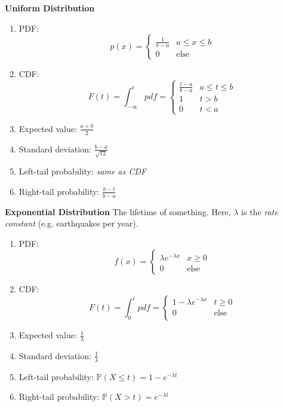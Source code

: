 \documentclass[titlepage, 12pt, leqno]{article}
\begin{document}
\begin{multicols*}{2}
\begin{enumerate}
\end{enumerate}
\textbf{Uniform Distribution}
\begin{enumerate}
    \item PDF: 
        \[
            p(x) =
            \begin{cases}
                \frac{1}{b-a} & a \le x \le b \\
                0 & \text{else}
            \end{cases}
        \]
    \item CDF:
        \[
            F(t) = \int_{-\infty}^{t}pdf =
            \begin{cases}
                \frac{t-a}{b-a} & a \le t \le b \\
                1 & t > b \\
                0 & t < a
            \end{cases}
        \]
    \item Expected value: $\frac{a+b}{2}$ 
    \item Standard deviation: $\frac{b-a}{\sqrt{12}}$
    \item Left-tail probability: \textit{same as CDF}
    \item Right-tail probability: $\frac{b-t}{b-a}$
\end{enumerate}
\textbf{Exponential Distribution}
The lifetime of something. Here, $\lambda$ is the \textit{rate constant} (e.g.
earthquakes per year).
\begin{enumerate}
    \item PDF: 
        \[
            f(x) =
            \begin{cases}
                \lambda e^{-\lambda x} & x \ge 0 \\
                0 & \text{else}
            \end{cases}
        \]
    \item CDF:
        \[
            F(t) = \int_{0}^{t}pdf =
            \begin{cases}
                1 - \lambda e^{-\lambda x} & t \ge 0 \\
                0 & \text{else} \\
            \end{cases}
        \]
    \item Expected value: $\frac{1}{\lambda}$ 
    \item Standard deviation: $\frac{1}{\lambda}$
    \item Left-tail probability: $\mathbb{P}(X\le t) = 1-e^{-\lambda t}$
    \item Right-tail probability: $\mathbb{P}(X>t) = e^{-\lambda t}$

\end{enumerate}
\end{multicols*}
\end{document}
